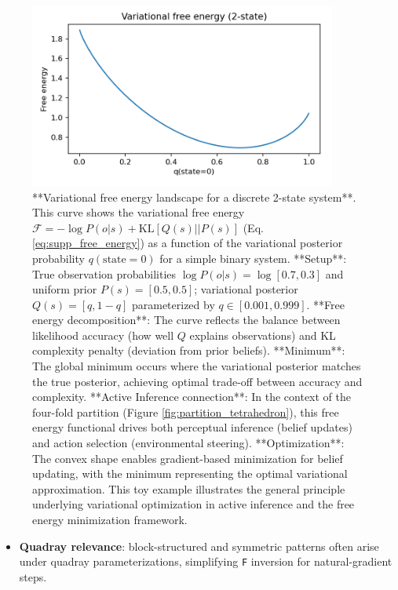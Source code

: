 \documentclass[
  10pt,
]{article}
\providecommand{\tightlist}{%
  \setlength{\itemsep}{0pt}\setlength{\parskip}{0pt}}
\begin{document}
\begin{figure}[htbp]
\centering
\includegraphics[width=0.9\textwidth]{figures/free_energy_curve.png}
\caption{**Variational free energy landscape for a discrete 2-state system**. This curve shows the variational free energy $\mathcal{F} = -\log P(o|s) + \text{KL}[Q(s)||P(s)]$ (Eq. \ref{eq:supp_free_energy}) as a function of the variational posterior probability $q(\text{state}=0)$ for a simple binary system. **Setup**: True observation probabilities $\log P(o|s) = \log[0.7, 0.3]$ and uniform prior $P(s) = [0.5, 0.5]$; variational posterior $Q(s) = [q, 1-q]$ parameterized by $q \in [0.001, 0.999]$. **Free energy decomposition**: The curve reflects the balance between likelihood accuracy (how well $Q$ explains observations) and KL complexity penalty (deviation from prior beliefs). **Minimum**: The global minimum occurs where the variational posterior matches the true posterior, achieving optimal trade-off between accuracy and complexity. **Active Inference connection**: In the context of the four-fold partition (Figure \ref{fig:partition_tetrahedron}), this free energy functional drives both perceptual inference (belief updates) and action selection (environmental steering). **Optimization**: The convex shape enables gradient-based minimization for belief updating, with the minimum representing the optimal variational approximation. This toy example illustrates the general principle underlying variational optimization in active inference and the free energy minimization framework.}
\label{fig:free_energy_curve}
\end{figure}

\begin{itemize}
\tightlist
\item
  \textbf{Quadray relevance}: block-structured and symmetric patterns
  often arise under quadray parameterizations, simplifying \texttt{F}
  inversion for natural-gradient steps.
\end{itemize}
\end{document}

